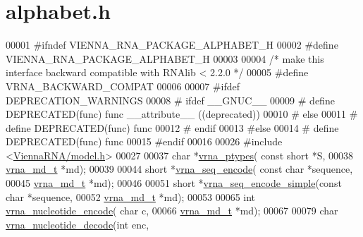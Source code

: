 \hypertarget{alphabet_8h_source}{}\section{alphabet.\+h}
\label{alphabet_8h_source}

\begin{DoxyCode}
00001 \textcolor{preprocessor}{#ifndef VIENNA\_RNA\_PACKAGE\_ALPHABET\_H}
00002 \textcolor{preprocessor}{#define VIENNA\_RNA\_PACKAGE\_ALPHABET\_H}
00003 
00004 \textcolor{comment}{/* make this interface backward compatible with RNAlib < 2.2.0 */}
00005 \textcolor{preprocessor}{#define VRNA\_BACKWARD\_COMPAT}
00006 
00007 \textcolor{preprocessor}{#ifdef DEPRECATION\_WARNINGS}
00008 \textcolor{preprocessor}{# ifdef \_\_GNUC\_\_}
00009 \textcolor{preprocessor}{#  define DEPRECATED(func) func \_\_attribute\_\_ ((deprecated))}
00010 \textcolor{preprocessor}{# else}
00011 \textcolor{preprocessor}{#  define DEPRECATED(func) func}
00012 \textcolor{preprocessor}{# endif}
00013 \textcolor{preprocessor}{#else}
00014 \textcolor{preprocessor}{# define DEPRECATED(func) func}
00015 \textcolor{preprocessor}{#endif}
00016 
00026 \textcolor{preprocessor}{#include <\hyperlink{model_8h}{ViennaRNA/model.h}>}
00027 
00037 \textcolor{keywordtype}{char}  *\hyperlink{alphabet_8h_a51a9e86a5f731f5f2f5584ee67cee4a8}{vrna\_ptypes}( \textcolor{keyword}{const} \textcolor{keywordtype}{short} *S,
00038                     \hyperlink{group__model__details_structvrna__md__s}{vrna\_md\_t} *md);
00039 
00044 \textcolor{keywordtype}{short} *\hyperlink{alphabet_8h_a636e7d6f888fd639587296a5eddea660}{vrna\_seq\_encode}( \textcolor{keyword}{const} \textcolor{keywordtype}{char} *sequence,
00045                         \hyperlink{group__model__details_structvrna__md__s}{vrna\_md\_t} *md);
00046 
00051 \textcolor{keywordtype}{short} *\hyperlink{alphabet_8h_a3cd79d21d53248ad2634c1c0d43e97d7}{vrna\_seq\_encode\_simple}(\textcolor{keyword}{const} \textcolor{keywordtype}{char} *sequence,
00052                               \hyperlink{group__model__details_structvrna__md__s}{vrna\_md\_t} *md);
00053 
00065 \textcolor{keywordtype}{int} \hyperlink{alphabet_8h_ac12bf00123f88621c9be847b0879c1fb}{vrna\_nucleotide\_encode}( \textcolor{keywordtype}{char} c,
00066                             \hyperlink{group__model__details_structvrna__md__s}{vrna\_md\_t} *md);
00067 
00079 \textcolor{keywordtype}{char} \hyperlink{alphabet_8h_a48ef585e697be9c8a08ed68c655e29b6}{vrna\_nucleotide\_decode}(\textcolor{keywordtype}{int} enc,

\end{DoxyCode}
